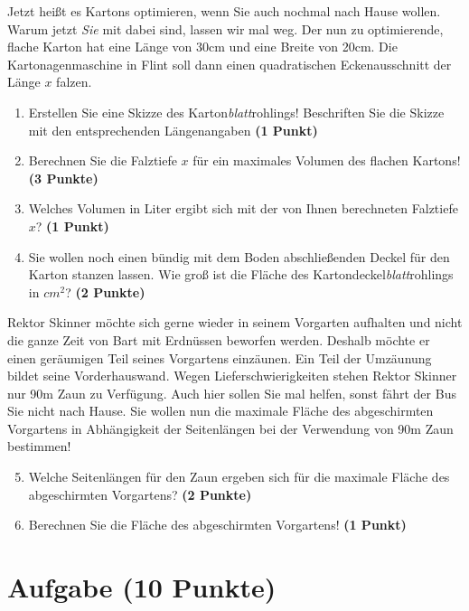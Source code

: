 \documentclass[a4paper, 9pt]{scrartcl}\usepackage[]{graphicx}\usepackage[]{xcolor}
\begin{document}
Jetzt heißt es Kartons optimieren, wenn Sie auch nochmal nach Hause wollen. Warum jetzt \textit{Sie} mit dabei sind, lassen wir mal weg. Der nun zu optimierende, flache Karton hat eine Länge von 30cm und eine Breite von 20cm. Die Kartonagenmaschine in Flint soll dann einen quadratischen Eckenausschnitt der Länge $x$ falzen.

\begin{enumerate}
\item Erstellen Sie eine Skizze des Karton\textit{blatt}rohlings! Beschriften Sie die Skizze mit den entsprechenden Längenangaben \textbf{(1 Punkt)}
\item Berechnen Sie die Falztiefe $x$ für ein maximales Volumen des flachen Kartons! \textbf{(3 Punkte)}
\item Welches Volumen in Liter ergibt sich mit der von Ihnen berechneten Falztiefe $x$?  \textbf{(1 Punkt)}
\item Sie wollen noch einen bündig mit dem Boden abschließenden Deckel für den Karton stanzen lassen. Wie groß ist die Fläche des Kartondeckel\textit{blatt}rohlings in $cm^2$? \textbf{(2 Punkte)}
\end{enumerate}

Rektor Skinner möchte sich gerne wieder in seinem Vorgarten aufhalten und nicht die ganze Zeit von Bart mit Erdnüssen beworfen werden. Deshalb möchte er einen geräumigen Teil seines Vorgartens einzäunen. Ein Teil der Umzäunung bildet seine Vorderhauswand. Wegen Lieferschwierigkeiten stehen Rektor Skinner nur 90m Zaun zu Verfügung. Auch hier sollen Sie mal helfen, sonst fährt der Bus Sie nicht nach Hause. Sie wollen nun die maximale Fläche des abgeschirmten Vorgartens in Abhängigkeit der Seitenlängen bei der Verwendung von 90m Zaun bestimmen!

\begin{enumerate}
  \setcounter{enumi}{4}  
\item  Welche Seitenlängen für den Zaun ergeben sich für die maximale Fläche des abgeschirmten Vorgartens? \textbf{(2 Punkte)}
\item Berechnen Sie die Fläche des abgeschirmten Vorgartens! \textbf{(1 Punkt)}
\end{enumerate}

 
\clearpage

\section{Aufgabe \hfill (10 Punkte)}
\end{document}
